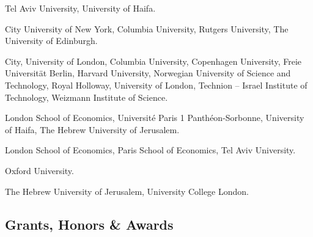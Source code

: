 \documentclass[10pt]{article}
\begin{document}
\begin{description}[font=\mdseries]
\item[2021]
    Tel Aviv University,
	University of Haifa.
\item[2020]
	City University of New York,
	Columbia University,
	Rutgers University,
	The University of Edinburgh.
\item[2019]
  City, University of London,
  Columbia University,
  Copenhagen University,
  Freie Universit\"{a}t Berlin,
  Harvard University,
  Norwegian University of Science and Technology,  
  Royal Holloway, University of London,
  Technion -- Israel Institute of Technology,
  Weizmann Institute of Science.
\item[2018]
	London School of Economics,
	Universit\'{e} Paris 1 Panth\'{e}on-Sorbonne,
	University of Haifa,
	The Hebrew University of Jerusalem.
\item[2017]
	London School of Economics,
  	Paris School of Economics,
  	Tel Aviv University.
\item[2016]
  Oxford University.
\item[2015]
  The Hebrew University of Jerusalem,
  University College London.
\end{description}

\subsection*{Grants, Honors \& Awards}
\end{document}
